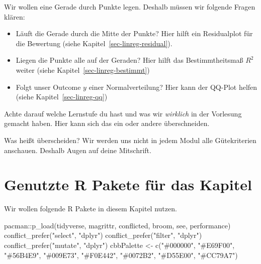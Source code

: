 \documentclass[
  letterpaper,
]{scrbook}
\newenvironment{Shaded}{\begin{snugshade}}{\end{snugshade}}
\newcommand{\FunctionTok}[1]{\textcolor[rgb]{0.28,0.35,0.67}{#1}}
\newcommand{\NormalTok}[1]{\textcolor[rgb]{0.00,0.23,0.31}{#1}}
\newcommand{\OtherTok}[1]{\textcolor[rgb]{0.00,0.23,0.31}{#1}}
\newcommand{\SpecialCharTok}[1]{\textcolor[rgb]{0.37,0.37,0.37}{#1}}
\newcommand{\StringTok}[1]{\textcolor[rgb]{0.13,0.47,0.30}{#1}}
\providecommand{\tightlist}{%
  \setlength{\itemsep}{0pt}\setlength{\parskip}{0pt}}\usepackage{longtable,booktabs,array}
\begin{document}
Wir wollen eine Gerade durch Punkte legen. Deshalb müssen wir folgende
Fragen klären:

\begin{itemize}
\tightlist
\item
  Läuft die Gerade durch die Mitte der Punkte? Hier hilft ein
  Residualplot für die Bewertung (siehe
  Kapitel~\ref{sec-linreg-residual}).
\item
  Liegen die Punkte alle auf der Geraden? Hier hilft das
  Bestimmtheitsmaß \(R^2\) weiter (siehe
  Kapitel~\ref{sec-linreg-bestimmt})
\item
  Folgt unser Outcome \(y\) einer Normalverteilung? Hier kann der
  QQ-Plot helfen (siehe Kapitel~\ref{sec-linreg-qq})
\end{itemize}

\begin{tcolorbox}[enhanced jigsaw, coltitle=black, titlerule=0mm, bottomrule=.15mm, opacityback=0, opacitybacktitle=0.6, leftrule=.75mm, title=\textcolor{quarto-callout-caution-color}{\faFire}\hspace{0.5em}{Ein Wort zur Klausur}, toprule=.15mm, bottomtitle=1mm, toptitle=1mm, left=2mm, breakable, arc=.35mm, colback=white, rightrule=.15mm, colbacktitle=quarto-callout-caution-color!10!white, colframe=quarto-callout-caution-color-frame]
Achte darauf welche Lernstufe du hast und was wir \emph{wirklich} in der
Vorlesung gemacht haben. Hier kann sich das ein oder andere
überschneiden.

Was heißt überscheiden? Wir werden uns nicht in jedem Modul alle
Gütekriterien anschauen. Deshalb Augen auf deine Mitschrift.
\end{tcolorbox}

\hypertarget{genutzte-r-pakete-fuxfcr-das-kapitel-16}{%
\section{Genutzte R Pakete für das
Kapitel}\label{genutzte-r-pakete-fuxfcr-das-kapitel-16}}

Wir wollen folgende R Pakete in diesem Kapitel nutzen.

\begin{Shaded}
\begin{Highlighting}[]
\NormalTok{pacman}\SpecialCharTok{::}\FunctionTok{p\_load}\NormalTok{(tidyverse, magrittr, conflicted, broom,}
\NormalTok{               see, performance)}
\FunctionTok{conflict\_prefer}\NormalTok{(}\StringTok{"select"}\NormalTok{, }\StringTok{"dplyr"}\NormalTok{)}
\FunctionTok{conflict\_prefer}\NormalTok{(}\StringTok{"filter"}\NormalTok{, }\StringTok{"dplyr"}\NormalTok{)}
\FunctionTok{conflict\_prefer}\NormalTok{(}\StringTok{"mutate"}\NormalTok{, }\StringTok{"dplyr"}\NormalTok{)}
\NormalTok{cbbPalette }\OtherTok{\textless{}{-}} \FunctionTok{c}\NormalTok{(}\StringTok{"\#000000"}\NormalTok{, }\StringTok{"\#E69F00"}\NormalTok{, }\StringTok{"\#56B4E9"}\NormalTok{, }\StringTok{"\#009E73"}\NormalTok{, }
                \StringTok{"\#F0E442"}\NormalTok{, }\StringTok{"\#0072B2"}\NormalTok{, }\StringTok{"\#D55E00"}\NormalTok{, }\StringTok{"\#CC79A7"}\NormalTok{)}
\end{Highlighting}
\end{Shaded}
\end{document}
